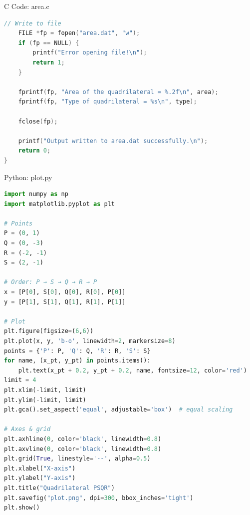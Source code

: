 \documentclass{beamer}
\numberwithin{equation}{section}
\theoremstyle{remark}
\begin{document}
\begin{frame}[fragile]{C Code: area.c}
\begin{lstlisting}[language=C]
    // Write to file
    FILE *fp = fopen("area.dat", "w");
    if (fp == NULL) {
        printf("Error opening file!\n");
        return 1;
    }

    fprintf(fp, "Area of the quadrilateral = %.2f\n", area);
    fprintf(fp, "Type of quadrilateral = %s\n", type);

    fclose(fp);

    printf("Output written to area.dat successfully.\n");
    return 0;
}
\end{lstlisting}
\end{frame}

\begin{frame}[fragile]{Python: plot.py}
\begin{lstlisting}[language=Python]
import numpy as np
import matplotlib.pyplot as plt

# Points
P = (0, 1)
Q = (0, -3)
R = (-2, -1)
S = (2, -1)

# Order: P → S → Q → R → P
x = [P[0], S[0], Q[0], R[0], P[0]]
y = [P[1], S[1], Q[1], R[1], P[1]]

# Plot
plt.figure(figsize=(6,6))
plt.plot(x, y, 'b-o', linewidth=2, markersize=8)
points = {'P': P, 'Q': Q, 'R': R, 'S': S}
for name, (x_pt, y_pt) in points.items():
    plt.text(x_pt + 0.2, y_pt + 0.2, name, fontsize=12, color='red')
limit = 4  
plt.xlim(-limit, limit)
plt.ylim(-limit, limit)
plt.gca().set_aspect('equal', adjustable='box')  # equal scaling

# Axes & grid
plt.axhline(0, color='black', linewidth=0.8)
plt.axvline(0, color='black', linewidth=0.8)
plt.grid(True, linestyle='--', alpha=0.5)
plt.xlabel("X-axis")
plt.ylabel("Y-axis")
plt.title("Quadrilateral PSQR")
plt.savefig("plot.png", dpi=300, bbox_inches='tight')
plt.show()
\end{lstlisting}
\end{frame}
\end{document}
